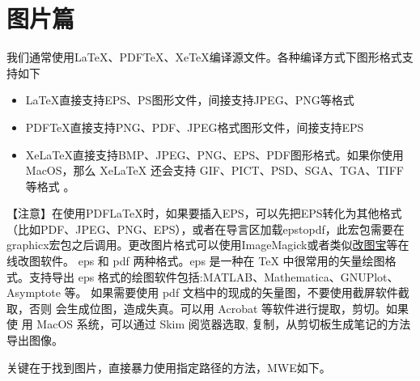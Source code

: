 %
%
%
%


\section{图片篇}



我们通常使用LaTeX、PDFTeX、XeTeX编译源文件。各种编译方式下图形格式支持如下
\begin{itemize}
    \item LaTeX直接支持EPS、PS图形文件，间接支持JPEG、PNG等格式
    \item PDFTeX直接支持PNG、PDF、JPEG格式图形文件，间接支持EPS
    \item XeLaTeX直接支持BMP、JPEG、PNG、EPS、PDF图形格式。如果你使用MacOS，那么
    XeLaTeX 还会支持 GIF、PICT、PSD、SGA、TGA、TIFF 等格式 。
\end{itemize}

【注意】在使用PDFLaTeX时，如果要插入EPS，可以先把EPS转化为其他格式（比如PDF、JPEG、PNG、EPS），或者在导言区加载epstopdf，此宏包需要在graphicx宏包之后调用。更改图片格式可以使用ImageMagick或者类似\href{http://www.gaitubao.com}{改图宝}等在线改图软件。
eps 和 pdf 两种格式。eps 是一种在 TeX 中很常用的矢量绘图格式。支持导出
eps 格式的绘图软件包括:MATLAB、Mathematica、GNUPlot、 Asymptote 等。
如果需要使用 pdf 文档中的现成的矢量图，不要使用截屏软件截取，否则
会生成位图，造成失真。可以用 Acrobat 等软件进行提取，剪切。如果使 用
MacOS 系统，可以通过 Skim 阅览器选取,
复制，从剪切板生成笔记的方法导出图像。


关键在于找到图片，直接暴力使用指定路径的方法，MWE如下。

